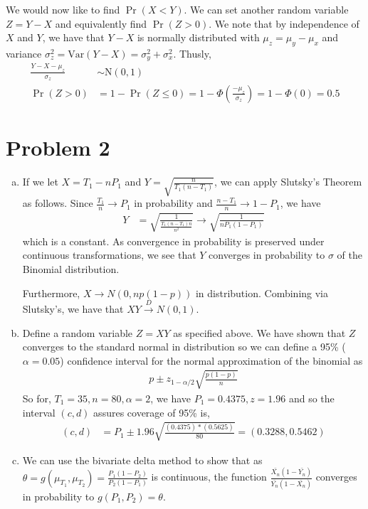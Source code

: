 \documentclass[11pt]{article}
\begin{document}
We would now like to find $\Pr{(X < Y)}$.  We can set another random
variable $Z = Y - X$ and equivalently find $\Pr{(Z > 0)}$.  We note that
by independence of $X$ and $Y$, we have that $Y-X$ is normally
distributed with $\mu_z = \mu_y - \mu_x$ and variance $\sigma_z^2 =
\mathrm{Var}(Y-X) = \sigma_y^2 + \sigma_x^2$.  Thusly,
\begin{align*}
  \frac{Y-X-\mu_z}{\sigma_z} &\sim \mathrm{N}(0,1) \\
  \Pr{(Z > 0)} &= 1 - \Pr{(Z \le 0)} = 1 - \Phi \left(
                  \frac{-\mu_z}{\sigma_z} \right) = 1 - \Phi (0) = 0.5
\end{align*}

\newpage
\section*{Problem 2}

\begin{enumerate}[(a)]
  \item If we let $X = T_1 - n P_1$ and $Y =
    \sqrt{\frac{n}{T_1(n-T_1)}}$, we can apply Slutsky's Theorem as
    follows.  Since $\frac{T_1}{n} \rightarrow P_1$ in probability and
    $\frac{n-T_1}{n} \rightarrow 1-P_1$, we have
    \begin{align*}
      Y &= \sqrt{\frac{1}{\frac{T_1(n-T_1)n}{n^2}}} \rightarrow
          \sqrt{\frac{1}{nP_1(1-P_1)}}
    \end{align*}
    which is a constant.  As convergence in probability is preserved
    under continuous transformations, we see that $Y$ converges in
    probability to $\sigma$ of the Binomial distribution.

    Furthermore, $X \rightarrow N(0, np(1-p))$ in distribution.
    Combining via Slutsky's, we have that $XY \xrightarrow{D} N(0,1)$.
\newpage
  \item Define a random variable $Z = XY$ as specified above.  We have
    shown that $Z$ converges to the standard normal in distribution so
    we can define a 95\% ($\alpha = 0.05$) confidence interval for the
    normal approximation of the binomial as
    \begin{align*}
      p \pm z_{1-\alpha/2} \sqrt{\frac{p(1-p)}{n}}
    \end{align*}
    So for, $T_1 = 35, n = 80, \alpha = 2$, we have $P_1 = 0.4375, z =
    1.96$ and so the interval $(c,d)$ assures coverage of 95\% is,
    \begin{align*}
      (c,d) &= P_1 \pm 1.96 \sqrt{\frac{(0.4375)*(0.5625)}{80}} =
              (0.3288, 0.5462)
    \end{align*}
\newpage
  \item We can use the bivariate delta method to show that as $\theta
    = g(\mu_{T_1}, \mu_{T_2}) = \frac{P_1(1-P_2)}{P_2(1-P_1)}$ is
    continuous, the function
    $\frac{\bar{X_n}(1-\bar{Y_n})}{\bar{Y_n}(1-\bar{X_n})}$
    converges in probability to $g(P_1,P_2) = \theta$.
\end{enumerate}
\end{document}
